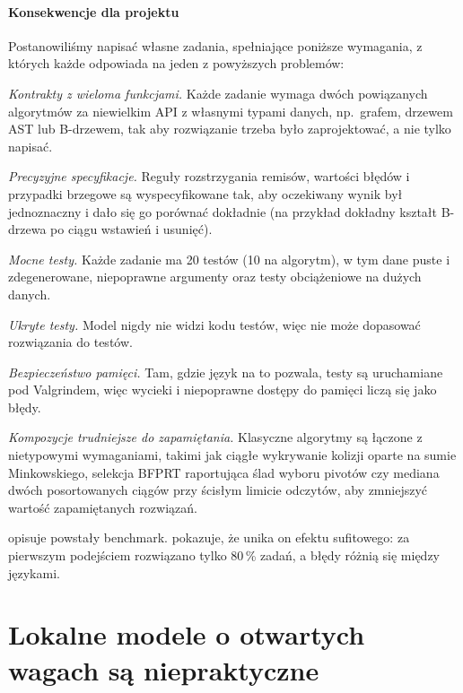 \paragraph{Konsekwencje dla projektu} Postanowiliśmy napisać własne zadania, spełniające poniższe
wymagania, z których każde odpowiada na jeden z powyższych problemów:
\begin{description}[leftmargin=2.4em,labelwidth=2em,itemsep=2pt]
  \item[D1] \emph{Kontrakty z wieloma funkcjami.} Każde zadanie wymaga dwóch powiązanych algorytmów
    za niewielkim API z własnymi typami danych, np.\ grafem, drzewem AST lub B-drzewem, tak aby
    rozwiązanie trzeba było zaprojektować, a nie tylko napisać.
  \item[D2] \emph{Precyzyjne specyfikacje.} Reguły rozstrzygania remisów, wartości błędów
    i przypadki brzegowe są wyspecyfikowane tak, aby oczekiwany wynik był jednoznaczny i dało się
    go porównać dokładnie (na przykład dokładny kształt B-drzewa po ciągu wstawień i usunięć).
  \item[D3] \emph{Mocne testy.} Każde zadanie ma 20 testów (10 na algorytm), w tym dane puste
    i zdegenerowane, niepoprawne argumenty oraz testy obciążeniowe na dużych danych.
  \item[D4] \emph{Ukryte testy.} Model nigdy nie widzi kodu testów, więc nie może dopasować
    rozwiązania do testów.
  \item[D5] \emph{Bezpieczeństwo pamięci.} Tam, gdzie język na to pozwala, testy są uruchamiane pod
    Valgrindem, więc wycieki i niepoprawne dostępy do pamięci liczą się jako błędy.
  \item[D6] \emph{Kompozycje trudniejsze do zapamiętania.} Klasyczne algorytmy są łączone
    z nietypowymi wymaganiami, takimi jak ciągłe wykrywanie kolizji oparte na sumie Minkowskiego,
    selekcja BFPRT raportująca ślad wyboru pivotów czy mediana dwóch posortowanych ciągów przy
    ścisłym limicie odczytów, aby zmniejszyć wartość zapamiętanych rozwiązań.
\end{description}
 opisuje powstały benchmark.  pokazuje, że unika on efektu
sufitowego: za pierwszym podejściem rozwiązano tylko 80\,\% zadań, a błędy różnią się między
językami.

\section{Lokalne modele o otwartych wagach są niepraktyczne}
\label{sec:local-llms}


